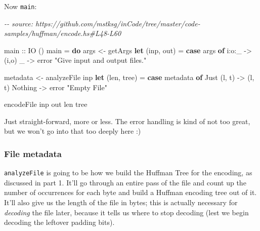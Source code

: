 \documentclass[]{article}
\newenvironment{Shaded}{}{}
\newcommand{\CommentTok}[1]{\textcolor[rgb]{0.38,0.63,0.69}{\textit{#1}}}
\newcommand{\DataTypeTok}[1]{\textcolor[rgb]{0.56,0.13,0.00}{#1}}
\newcommand{\FunctionTok}[1]{\textcolor[rgb]{0.02,0.16,0.49}{#1}}
\newcommand{\KeywordTok}[1]{\textcolor[rgb]{0.00,0.44,0.13}{\textbf{#1}}}
\newcommand{\NormalTok}[1]{#1}
\newcommand{\OperatorTok}[1]{\textcolor[rgb]{0.40,0.40,0.40}{#1}}
\newcommand{\OtherTok}[1]{\textcolor[rgb]{0.00,0.44,0.13}{#1}}
\newcommand{\StringTok}[1]{\textcolor[rgb]{0.25,0.44,0.63}{#1}}
\begin{document}
Now \texttt{main}:

\begin{Shaded}
\begin{Highlighting}[]
\CommentTok{{-}{-} source: https://github.com/mstksg/inCode/tree/master/code{-}samples/huffman/encode.hs\#L48{-}L60}

\OtherTok{main ::} \DataTypeTok{IO}\NormalTok{ ()}
\NormalTok{main }\OtherTok{=} \KeywordTok{do}
\NormalTok{    args     }\OtherTok{\textless{}{-}}\NormalTok{ getArgs}
    \KeywordTok{let}\NormalTok{ (inp, out)  }\OtherTok{=} \KeywordTok{case}\NormalTok{ args }\KeywordTok{of}
\NormalTok{                        i}\OperatorTok{:}\NormalTok{o}\OperatorTok{:}\NormalTok{\_      }\OtherTok{{-}\textgreater{}}\NormalTok{ (i,o)}
\NormalTok{                        \_          }\OtherTok{{-}\textgreater{}} \FunctionTok{error} \StringTok{"Give input and output files."}

\NormalTok{    metadata }\OtherTok{\textless{}{-}}\NormalTok{ analyzeFile inp}
    \KeywordTok{let}\NormalTok{ (len, tree) }\OtherTok{=} \KeywordTok{case}\NormalTok{ metadata }\KeywordTok{of}
                        \DataTypeTok{Just}\NormalTok{ (l, t) }\OtherTok{{-}\textgreater{}}\NormalTok{ (l, t)}
                        \DataTypeTok{Nothing}     \OtherTok{{-}\textgreater{}} \FunctionTok{error} \StringTok{"Empty File"}

\NormalTok{    encodeFile inp out len tree}
\end{Highlighting}
\end{Shaded}

Just straight-forward, more or less. The error handling is kind of not too
great, but we won't go into that too deeply here :)

\subsubsection{File metadata}\label{file-metadata}

\texttt{analyzeFile} is going to be how we build the Huffman Tree for the
encoding, as discussed in part 1. It'll go through an entire pass of the file
and count up the number of occurrences for each byte and build a Huffman
encoding tree out of it. It'll also give us the length of the file in bytes;
this is actually necessary for \emph{decoding} the file later, because it tells
us where to stop decoding (lest we begin decoding the leftover padding bits).
\end{document}

